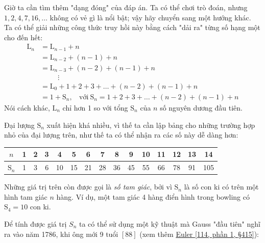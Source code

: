 Giờ ta cần tìm thêm "dạng đóng" của đáp án. Ta có thể chơi trò đoán, nhưng $1, 2, 4, 7, 16, \dots$ không có vẻ gì là nổi bật; vậy hãy chuyển sang một hướng khác. Ta có thể giải những công thức truy hồi này bằng cách "dải ra" từng số hạng một cho đến hết:
\begin{equation*}
    \begin{split}
        \mathrm{L}_n & = \mathrm{L}_{n - 1} + n \\
        & = \mathrm{L}_{n - 2} + (n - 1) + n \\
        & = \mathrm{L}_{n - 3} + (n - 2) + (n - 1) + n \\
        & \ \ \ \ \ \ \ \ \ \ \ \vdots \\
        & = \mathrm{L}_0 + 1 + 2 + 3 + \dots + (n - 2) + (n - 1) + n \\
        & = 1 + \mathrm{S}_n, \ \ \ \ \text{với} \ \mathrm{S}_n = 1 + 2 + 3 + \dots + (n - 2) + (n - 1) + n
    \end{split}
\end{equation*}
Nói cách khác, $\mathrm{L}_{n}$ chỉ hơn 1 so với tổng $\mathrm{S}_n$ của $n$ số nguyên dương đầu tiên.

Đại lượng $\mathrm{S}_n$ xuất hiện khá nhiều, vì thế ta cần lập bảng cho những trường hợp nhỏ của đại lượng trên, như thế ta có thể nhận ra các số này dễ dàng hơn:

\begin{center}
    \begin{tabular}{c | *{14}{c}}
        $n$ & 1 & 2 & 3 & 4 & 5 & 6 & 7 & 8 & 9 & 10 & 11 & 12 & 13 & 14 \\
        \hline
        $\mathrm{S}_n$ & 1 & 3 & 6 & 10 & 15 & 21 & 28 & 36 & 45 & 55 & 66 & 78 & 91 & 105 \\ 
    \end{tabular}
\end{center}
Những giá trị trên còn được gọi là \textit{số tam giác}, bởi vì $\mathrm{S}_n$ là số con ki có trên một hình tam giác $n$ hàng. Ví dụ, một tam giác 4 hàng điển hình trong bowling có $\mathrm{S}_4 = 10$ con ki.

Để tính được giá trị $S_n$ ta có thể sử dụng một kỹ thuật mà Gauss 
"đầu tiên" nghĩ ra vào năm 1786, khi ông mới 9 tuổi \href{G. Waldo Dunnington, Carl Friedrich Gauss: Titan of Science. Exposition Press, New York, 1955.}{$[88]$} (xem thêm \href{Leonhard Euler, Vollstandige Anleitung zur Algebra. Erster Theil. Von den verschiedenen Rechnungs-Arten, Verhaltnissen und Proportionen. St. Petersburg, 1770. Reprinted in his Opera Omnia, series 1, volume 1. Translated into Russian, 1768; Dutch, 1773; French, 1774; Latin, 1790; English, 1797.}{Euler [114, phần 1, §415]}):

